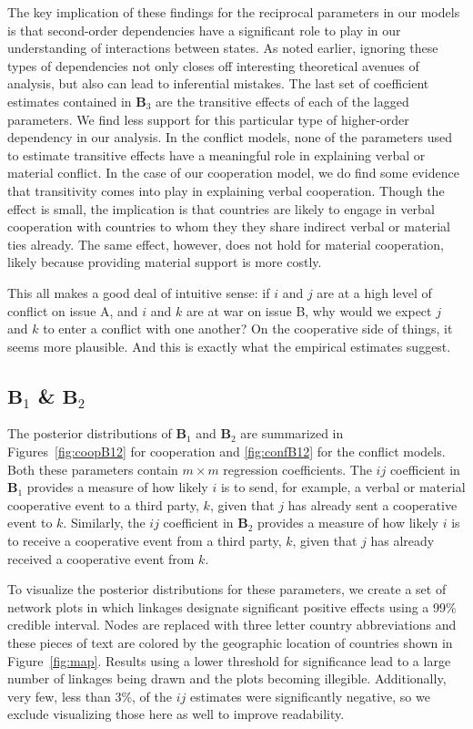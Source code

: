 \documentclass[3p,times,twocolumn,authoryear,12pt]{elsarticle}
\newcommand{\bl}[1]{{\mathbf #1}}
\begin{document}
The key implication of these findings for the reciprocal parameters in our models is that second-order dependencies have a significant role to play in our understanding of interactions between states. As noted earlier, ignoring these types of dependencies not only closes off interesting theoretical avenues of analysis, but also can lead to inferential mistakes. The last set of coefficient estimates contained in $\bl B_3$  are the transitive effects of each of the lagged parameters. We find less support for this particular type of higher-order dependency in our analysis. In the conflict models, none of the parameters used to estimate transitive effects have a meaningful role in explaining verbal or material conflict. In the case of our cooperation model, we do find some evidence that transitivity comes into play in explaining verbal cooperation. Though the effect is small, the implication is that countries are likely to engage in verbal cooperation with countries to whom they they share indirect verbal or material ties already. The same effect, however, does not hold for material cooperation, likely because providing material support is more costly. 

This all makes a good deal of intuitive sense: if $i$ and $j$ are at a high level of conflict on issue A, and $i$ and $k$ are at war on issue B, why would we expect $j$ and $k$ to enter a conflict with one another? On the cooperative side of things, it seems more plausible. And this is exactly what the empirical estimates suggest.

\subsection{$\bl B_{1}$ \& $\bl B_{2}$}

The posterior distributions of $\bl B_{1}$ and $\bl B_{2}$ are summarized in Figures~\ref{fig:coopB12} for cooperation and \ref{fig:confB12} for the conflict models. Both these parameters contain $m \times m$ regression coefficients. The $ij$ coefficient in $\bl B_{1}$ provides a measure of how likely $i$ is to send, for example, a verbal or material cooperative event to a third party, $k$, given that $j$ has already sent a cooperative event to $k$. Similarly, the $ij$ coefficient in $\bl B_{2}$ provides a measure of how likely $i$ is to receive a cooperative event from a third party, $k$, given that $j$ has already received a cooperative event from $k$. 

To visualize the posterior distributions for these parameters, we create a set of network plots in which linkages designate significant positive effects using a 99\% credible interval. Nodes are replaced with three letter country abbreviations and these pieces of text are colored by the geographic location of countries shown in Figure~\ref{fig:map}. Results using a lower threshold for significance lead to a large number of linkages being drawn and the plots becoming illegible. Additionally, very few, less than 3\%, of the $ij$ estimates were significantly negative, so we exclude visualizing those here as well to improve readability. 
\end{document}
